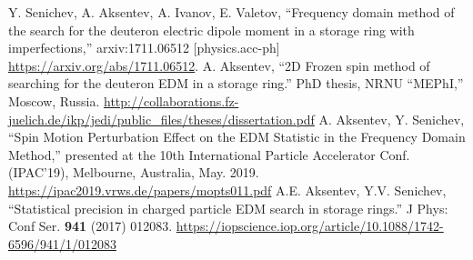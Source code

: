 \documentclass[12pt]{article}
\begin{document}
\begin{thebibliography}{0}
	Y. Senichev, A. Aksentev, A. Ivanov, E. Valetov, ``Frequency domain method of the search for
	the deuteron electric dipole moment in a storage ring with imperfections,'' arxiv:1711.06512 [physics.acc-ph]
	\url{https://arxiv.org/abs/1711.06512}.
	A. Aksentev, ``2D Frozen spin method of searching for the deuteron EDM in a storage ring.'' PhD thesis, NRNU ``MEPhI,'' Moscow, Russia.
	\url{http://collaborations.fz-juelich.de/ikp/jedi/public_files/theses/dissertation.pdf}
	A. Aksentev, Y. Senichev, ``Spin Motion Perturbation Effect on the EDM Statistic
	in the Frequency Domain Method,'' presented at the 10th International Particle Accelerator Conf. (IPAC'19),
	Melbourne, Australia, May. 2019.
	\url{https://ipac2019.vrws.de/papers/mopts011.pdf}
	A.E. Aksentev, Y.V. Senichev, ``Statistical precision in charged particle EDM search in storage rings.'' J Phys: Conf Ser. \textbf{941} (2017) 012083. 
	\url{https://iopscience.iop.org/article/10.1088/1742-6596/941/1/012083}
	
\end{thebibliography}
\end{document}

